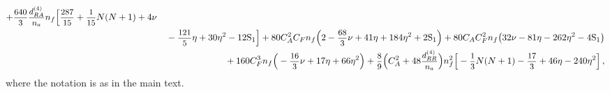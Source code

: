 \documentclass[
 twocolumn,
 superscriptaddress,
 preprintnumbers,
 nofootinbib,
 amsmath,amssymb,
 aps,
 prl
 ]{revtex4-2}
\newcommand\HS{\mathrm{S}}
\def\frct#1#2{\mbox{\small{$\displaystyle\frac{#1}{#2}$}}}
\begin{document}
\begin{widetext}
\begin{eqnarray}
+\frct{640}{3}\*\frct{d_{RA}^{(4)}}{n_a}\*n_f\*\Big[
\frct{287}{15}
+\frct{1}{15}\*N\*(N+1)
+4\*\nu
\nonumber\\ &&{}
-\frct{121}{5}\*\eta
+30\*\eta^2
-12\*\HS_{1}
\Big]

+80\*C_A^2\*C_F\*n_f\*\Big(2
-\frct{68}{3}\*\nu
+41\*\eta
+184\*\eta^2
+2\*\HS_{1}
\Big)

+80\*C_A\*C_F^2\*n_f\*\big(32\*\nu
-81\*\eta
-262\*\eta^2
-4\*\HS_{1}
\big)
\nonumber\\ &&{}

+160\*C_F^3\*n_f\*\Big(
-\frct{16}{3}\*\nu
+17\*\eta
+66\*\eta^2
\Big)



+\frct{8}{9}\*\Big(C_A^2+48\*\frct{d_{RR}^{(4)}}{n_a}\Big)\*n_f^2\*\Big[
-\frct{1}{3}\*N\*(N+1)
-\frct{17}{3}
+46\*\eta
-240\*\eta^2
\Big]


\,,
\end{eqnarray}
where the notation is as in the main text.
\end{widetext}
\end{document}
